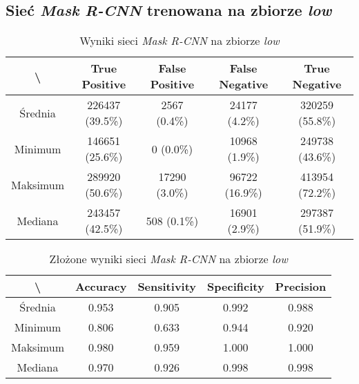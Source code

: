 \subsection{Sieć \textit{Mask R-CNN} trenowana na zbiorze \textit{low}}
\lowprocent

\begin{table}[H]
  \centering
	\caption{Wyniki sieci \textit{Mask R-CNN} na zbiorze \textit{low}}
	\vspace{6pt}
	{\footnotesize
		\begin{tabular}{|c|c|c|c|c|}
      \hline \textbackslash & True Positive & False Positive & False Negative & True Negative \\
      \hline Średnia & 226437 (39.5\%) & 2567 (0.4\%) & 24177 (4.2\%) & 320259 (55.8\%) \\
      \hline Minimum & 146651 (25.6\%) & 0 (0.0\%) & 10968 (1.9\%) & 249738 (43.6\%) \\
      \hline Maksimum & 289920 (50.6\%) & 17290 (3.0\%) & 96722 (16.9\%) & 413954 (72.2\%) \\
      \hline Mediana & 243457 (42.5\%) & 508 (0.1\%) & 16901 (2.9\%) & 297387 (51.9\%) \\
      \hline
		\end{tabular}
	}
  \vspace{0pt}
  \label{Tab:low_original}
\end{table}


\begin{table}[H]
	\centering
	\caption{Złożone wyniki sieci \textit{Mask R-CNN} na zbiorze \textit{low}}
	\vspace{6pt}
	{\footnotesize
		\begin{tabular}{|c|c|c|c|c|}
      \hline \textbackslash & Accuracy & Sensitivity & Specificity & Precision \\
      \hline Średnia & 0.953 & 0.905 & 0.992 & 0.988 \\
      \hline Minimum & 0.806 & 0.633 & 0.944 & 0.920 \\
      \hline Maksimum & 0.980 & 0.959 & 1.000 & 1.000 \\
      \hline Mediana & 0.970 & 0.926 & 0.998 & 0.998 \\
      \hline
		\end{tabular}
	}
  \vspace{0pt}
  \label{Tab:low_original_calculated}
\end{table}

